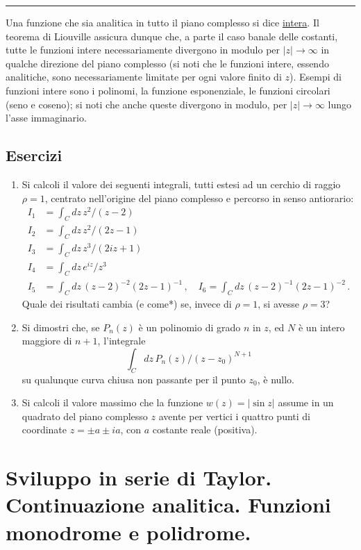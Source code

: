 \documentclass[11pt, a4paper]{book}
\numberwithin{equation}{section}
\newenvironment{esercizi}{\subsection*{Esercizi}\begin{enumerate}}{\end{enumerate}}
\begin{document}
\medskip\hrule\medskip

Una funzione che sia analitica in tutto il piano complesso si dice \underline{intera}. Il teorema di Liouville assicura dunque che, a parte il caso banale delle costanti, tutte le funzioni intere necessariamente divergono in modulo per $|z| \to \infty$ in qualche direzione del piano complesso (si noti che le funzioni intere, essendo analitiche, sono necessariamente limitate per ogni valore finito di $z$). Esempi di funzioni intere sono i polinomi, la funzione esponenziale, le funzioni circolari (seno e coseno); si noti che anche queste divergono in modulo, per $|z| \to \infty$ lungo l'asse immaginario.

\begin{esercizi}

\item Si calcoli il valore dei seguenti integrali, tutti estesi ad un cerchio di raggio $\rho = 1$, centrato nell'origine del piano complesso e percorso in senso antiorario:
\begin{align*}
I_1 &= \int_C dz\, z^2/(z-2) \\
I_2 &= \int_C dz\, z^2/(2z-1) \\
I_3 &= \int_C dz\, z^3/(2iz+1) \\
I_4 &= \int_C dz\, e^{iz}/z^3 \\
I_5 &= \int_C dz\, (z-2)^{-2}(2z-1)^{-1}\,, \quad
I_6 = \int_C dz\, (z-2)^{-1}(2z-1)^{-2}\,.
\end{align*}
Quale dei risultati cambia (e come*) se, invece di $\rho = 1$, si avesse $\rho = 3$?

\item Si dimostri che, se $P_n(z)$ è un polinomio di grado $n$ in $z$, ed $N$ è un intero maggiore di $n+1$, l'integrale
\[
\int_C dz\, P_n(z)/(z-z_0)^{N+1}
\]
su qualunque curva chiusa non passante per il punto $z_0$, è nullo.

\item Si calcoli il valore massimo che la funzione $w(z) = |\sin z|$ assume in un quadrato del piano complesso $z$ avente per vertici i quattro punti di coordinate $z = \pm a \pm ia$, con $a$ costante reale (positiva).

\end{esercizi}

\section{Sviluppo in serie di Taylor. Continuazione analitica. Funzioni monodrome e polidrome.}
\end{document}
